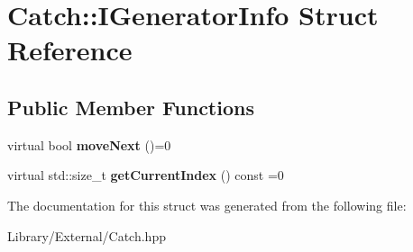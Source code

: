 \hypertarget{struct_catch_1_1_i_generator_info}{}\section{Catch\+:\+:I\+Generator\+Info Struct Reference}
\label{struct_catch_1_1_i_generator_info}
\subsection*{Public Member Functions}
\begin{DoxyCompactItemize}
\item 
\hypertarget{struct_catch_1_1_i_generator_info_a2b86711ca7009903edfe27ed62b515ef}{}virtual bool {\bfseries move\+Next} ()=0\label{struct_catch_1_1_i_generator_info_a2b86711ca7009903edfe27ed62b515ef}

\item 
\hypertarget{struct_catch_1_1_i_generator_info_a6a0dca712d31f6849fd9447b1344673a}{}virtual std\+::size\+\_\+t {\bfseries get\+Current\+Index} () const =0\label{struct_catch_1_1_i_generator_info_a6a0dca712d31f6849fd9447b1344673a}

\end{DoxyCompactItemize}


The documentation for this struct was generated from the following file\+:\begin{DoxyCompactItemize}
\item 
Library/\+External/Catch.\+hpp\end{DoxyCompactItemize}
